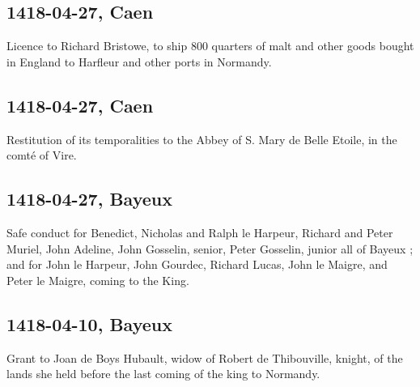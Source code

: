 \documentclass[a4paper,12pt,twoside]{book}
\begin{document}
                \subsection{1418-04-27, Caen}
                
                
                     Licence to Richard Bristowe, to ship 800 quarters of malt and other goods bought in England to Harfleur and other ports in Normandy.
                  
                
                \subsection{1418-04-27, Caen}
                
                
                     Restitution of its temporalities to the Abbey of S. Mary de Belle Etoile, in the comté of Vire.
                  
                
                \subsection{1418-04-27, Bayeux}
                
                
                     Safe conduct for Benedict, Nicholas and Ralph le Harpeur, Richard and Peter Muriel, John Adeline, John Gosselin, senior, Peter Gosselin, junior all of Bayeux ; and for John le Harpeur, John Gourdec, Richard Lucas, John le Maigre, and Peter le Maigre, coming to the King.
                  
                
                \subsection{1418-04-10, Bayeux}
                
                
                     Grant to Joan de Boys Hubault, widow of Robert de Thibouville, knight, of the lands she held before the last coming of the king to Normandy.
                  
                
\end{document}
